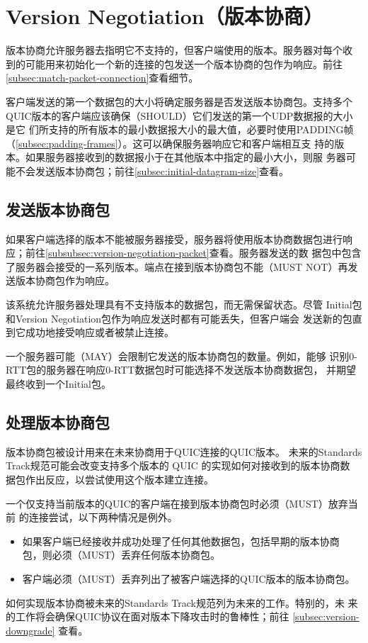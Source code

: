 \section{Version Negotiation（版本协商）}
版本协商允许服务器去指明它不支持的，但客户端使用的版本。服务器对每个收
到的可能用来初始化一个新的连接的包发送一个版本协商的包作为响应。前往
\ref{subsec:match-packet-connection}查看细节。

客户端发送的第一个数据包的大小将确定服务器是否发送版本协商包。支持多个
QUIC版本的客户端应该确保（SHOULD）它们发送的第一个UDP数据报的大小是它
们所支持的所有版本的最小数据报大小的最大值，必要时使用PADDING帧
（\ref{subsec:padding-frames}）。这可以确保服务器响应它和客户端相互支
持的版本。如果服务器接收到的数据报小于在其他版本中指定的最小大小，则服
务器可能不会发送版本协商包；前往\ref{subsec:initial-datagram-size}查看。

\subsection{发送版本协商包}
如果客户端选择的版本不能被服务器接受，服务器将使用版本协商数据包进行响
应；前往\ref{subsubsec:version-negotiation-packet}查看。服务器发送的数
据包中包含了服务器会接受的一系列版本。端点在接到版本协商包不能（MUST
NOT）再发送版本协商包作为响应。

该系统允许服务器处理具有不支持版本的数据包，而无需保留状态。尽管
Initial包和Version Negotiation包作为响应发送时都有可能丢失，但客户端会 
发送新的包直到它成功地接受响应或者被禁止连接。

一个服务器可能（MAY）会限制它发送的版本协商包的数量。例如，能够
识别0-RTT包的服务器在响应0-RTT数据包时可能选择不发送版本协商数据包，
并期望最终收到一个Initial包。

\subsection{处理版本协商包}
版本协商包被设计用来在未来协商用于QUIC连接的QUIC版本。 未来的Standards
Track规范可能会改变支持多个版本的 QUIC 的实现如何对接收到的版本协商数
据包作出反应，以尝试使用这个版本建立连接。

一个仅支持当前版本的QUIC的客户端在接到版本协商包时必须（MUST）放弃当前
的连接尝试，以下两种情况是例外。

\begin{itemize}
\item 如果客户端已经接收并成功处理了任何其他数据包，包括早期的版本协商
  包，则必须（MUST）丢弃任何版本协商包。
\item 客户端必须（MUST）丢弃列出了被客户端选择的QUIC版本的版本协商包。
\end{itemize}
如何实现版本协商被未来的Standards Track规范列为未来的工作。特别的，未
来的工作将会确保QUIC协议在面对版本下降攻击时的鲁棒性；前往
\ref{subsec:version-downgrade} 查看。